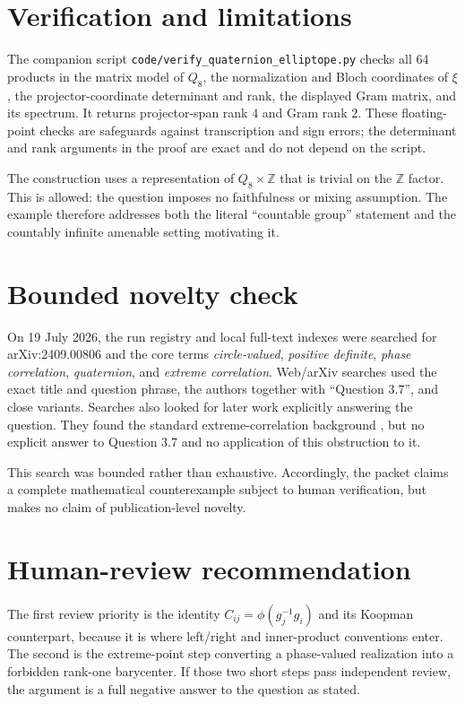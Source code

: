 \documentclass[11pt]{article}
\newcommand{\Z}{\mathbb Z}
\begin{document}
\section{Verification and limitations}

The companion script
\texttt{code/verify\_quaternion\_elliptope.py} checks all 64 products in the
matrix model of $Q_8$, the normalization and Bloch coordinates of $\xi$, the
projector-coordinate determinant and rank, the displayed Gram matrix, and its
spectrum.  It returns projector-span rank $4$ and Gram rank $2$.  These
floating-point checks are safeguards against transcription and sign errors;
the determinant and rank arguments in the proof are exact and do not depend
on the script.

The construction uses a representation of $Q_8\times\Z$ that is trivial on
the $\Z$ factor.  This is allowed: the question imposes no faithfulness or
mixing assumption.  The example therefore addresses both the literal
``countable group'' statement and the countably infinite amenable setting
motivating it.

\section{Bounded novelty check}

On 19 July 2026, the run registry and local full-text indexes were searched for
arXiv:2409.00806 and the core terms \emph{circle-valued}, \emph{positive
definite}, \emph{phase correlation}, \emph{quaternion}, and \emph{extreme
correlation}.  Web/arXiv searches used the exact title and question phrase,
the authors together with ``Question 3.7'', and close variants.  Searches also
looked for later work explicitly answering the question.  They found the
standard extreme-correlation background \cite{LiTam}, but no explicit answer
to Question 3.7 and no application of this obstruction to it.

This search was bounded rather than exhaustive.  Accordingly, the packet
claims a complete mathematical counterexample subject to human verification,
but makes no claim of publication-level novelty.

\section{Human-review recommendation}

The first review priority is the identity
$C_{ij}=\phi(g_j^{-1}g_i)$ and its Koopman counterpart, because it is where
left/right and inner-product conventions enter.  The second is the
extreme-point step converting a phase-valued realization into a forbidden
rank-one barycenter.  If those two short steps pass independent review, the
argument is a full negative answer to the question as stated.
\end{document}
